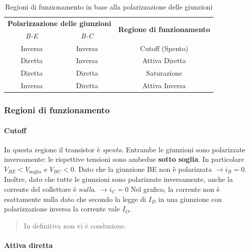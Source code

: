 \documentclass[
]{book}
\begin{document}
\begin{table}[h]
\centering
\begin{tabular}{|c|c|c|}
\hline
\multicolumn{2}{|c|}{\textbf{Polarizzazione delle giunzioni}} & \multirow{2}{*}{\textbf{Regione di funzionamento}} \\ \cline{1-2}
\emph{B-E} & \emph{B-C} &  \\ \hline
Inversa & Inversa & Cutoff (Spento) \\ \hline
Diretta & Inversa & Attiva Diretta \\ \hline
Diretta & Diretta & Saturazione \\ \hline
Inversa & Diretta & Attiva Inversa \\ \hline
\end{tabular}
\caption{Regioni di funzionamento in base alla polarizzazione delle giunzioni}
\label{tab:reg-bjt}
\end{table}

\subsubsection{Regioni di funzionamento}\label{regioni-di-funzionamento}

\paragraph{Cutoff}\label{cutoff}

In questa regione il transistor è \emph{spento}. Entrambe le giunzioni
sono polarizzate inversamente: le rispettive tensioni sono ambedue
\textbf{sotto soglia}. In particolare \(V_{BE}<V_{\text{soglia}}\) e
\(V_{BC}<0\). \newline Dato che la giunzione BE non è polarizzata
\(\to i_B = 0\). Inoltre, dato che tutte le giunzioni sono polarizzate
inversamente, anche la corrente del collettore è \emph{nulla}.
\(\to i_C = 0\) \newline Nel grafico, la corrente non è esattamente
nulla dato che secondo la legge di \(I_D\) in una giunzione con
polarizzazione inversa la corrente vale \(I_O\).

\begin{quote}
In definitiva non vi è conduzione.
\end{quote}

\paragraph{Attiva diretta}\label{attiva-diretta}
\end{document}
